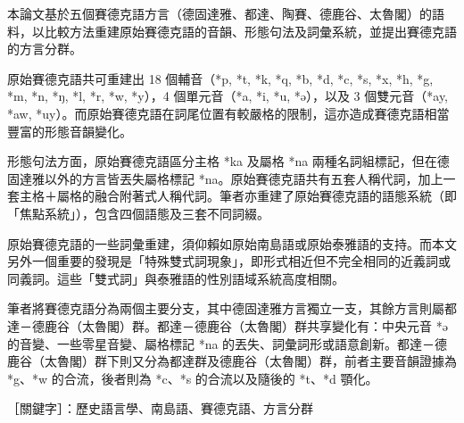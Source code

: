 \vspace{-1.25cm}
本論文基於五個賽德克語方言（德固達雅、都達、陶賽、德鹿谷、太魯閣）的語料，以比較方法重建原始賽德克語的音韻、形態句法及詞彙系統，並提出賽德克語的方言分群。

原始賽德克語共可重建出 18 個輔音（*p, *t, *k, *q, *b, *d, *c, *s, *x, *h, *g, *m, *n, *ŋ, *l, *r, *w, *y），4 個單元音（*a, *i, *u, *ə），以及 3 個雙元音（*ay, *aw, *uy）。而原始賽德克語在詞尾位置有較嚴格的限制，這亦造成賽德克語相當豐富的形態音韻變化。

形態句法方面，原始賽德克語區分主格 *ka 及屬格 *na 兩種名詞組標記，但在德固達雅以外的方言皆丟失屬格標記 *na。原始賽德克語共有五套人稱代詞，加上一套主格＋屬格的融合附著式人稱代詞。筆者亦重建了原始賽德克語的語態系統（即「焦點系統」），包含四個語態及三套不同詞綴。

原始賽德克語的一些詞彙重建，須仰賴如原始南島語或原始泰雅語的支持。而本文另外一個重要的發現是「特殊雙式詞現象」，即形式相近但不完全相同的近義詞或同義詞。這些「雙式詞」與泰雅語的性別語域系統高度相關。

筆者將賽德克語分為兩個主要分支，其中德固達雅方言獨立一支，其餘方言則屬都達－德鹿谷（太魯閣）群。都達－德鹿谷（太魯閣）群共享變化有：中央元音 *ə 的音變、一些零星音變、屬格標記 *na 的丟失、詞彙詞形或語意創新。都達－德鹿谷（太魯閣）群下則又分為都達群及德鹿谷（太魯閣）群，前者主要音韻證據為 *g、*w 的合流，後者則為 *c、*s 的合流以及隨後的 *t、*d 顎化。

\noindent ［關鍵字］：歷史語言學、南島語、賽德克語、方言分群